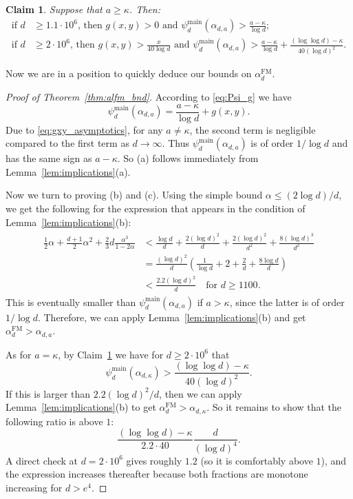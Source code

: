 \documentclass[12pt]{amsart}
\newtheorem{claim}[theorem]{Claim}
\theoremstyle{definition}
\newcommand\al{\alpha}
\newcommand\ka{\kappa}
\newcommand\alfm{\alpha^{\mathrm{FM}}}
\newcommand\psimain{\psi^{\mathrm{main}}}
\begin{document}
%
\begin{claim} \label{cl:g_pos}
Suppose that $a \geq \ka$. Then:
%
\begin{align*}
\text{if } d &\geq 1.1 \cdot 10^6
\text{, then } g(x,y)>0 
\text{ and } \psimain_d(\al_{d,a}) > \frac{a-\ka}{\log d} ;\\
\text{if } d &\geq 2 \cdot 10^6
\text{, then } g(x,y)> \frac{x}{40 \log d} 
\text{ and } \psimain_d(\al_{d,a}) > \frac{a-\ka}{\log d} 
+ \frac{(\log\log d)-\ka}{40(\log d)^2} .
\end{align*}
%
\end{claim}
%
Now we are in a position to quickly deduce our bounds on $\alfm_d$.
%
\begin{proof}[Proof of Theorem~\ref{thm:alfm_bnd}]
According to \eqref{eq:Psi_g} we have 
%
\[ \psimain_d(\al_{d,a}) = \frac{a-\ka}{\log d} + g(x,y) . \]
%
Due to \eqref{eq:gxy_asymptotics}, for any $a \neq \ka$, the second term is negligible compared to the first term as $d \to \infty$. Thus $\psimain_d(\al_{d,a})$ is of order $1/ \log d$ and has the same sign as $a-\ka$. So (a) follows immediately from Lemma~\ref{lem:implications}(a). 

Now we turn to proving (b) and (c). Using the simple bound $\al \leq (2 \log d)/d$, we get the following for the expression that appears in the condition of Lemma~\ref{lem:implications}(b):
%
\begin{align}
\begin{split}
\frac 12 \al + \frac{d+1}{2}\al^2 
+ \frac 23 d \frac{\al^3}{1-2\al} 
&< \frac{\log d}{d} 
+ \frac{2 (\log d)^2}{d} 
+ \frac{2 (\log d)^2}{d^2}
+ \frac{8 (\log d)^3}{d^2} \\ 
&= \frac{(\log d)^2}{d} 
\left( \frac{1}{\log d} + 2 + \frac{2}{d} 
+ \frac{8 \log d}{d} \right) \\
&< \frac{2.2 (\log d)^2}{d} 
\quad \text{for } d \geq 1100 .
\label{eq:cond_b_bnd}
\end{split}
\end{align}
%
This is eventually smaller than $\psimain_d(\al_{d,a})$ if $a>\ka$, since the latter is of order $1/ \log d$. Therefore, we can apply Lemma~\ref{lem:implications}(b) and get $\alfm_d > \al_{d,a}$. 

As for $a=\ka$, by Claim~\ref{cl:g_pos} we have for $d \geq 2 \cdot 10^6$ that 
%
\[ \psimain_d(\al_{d,\ka}) 
> \frac{(\log\log d)-\ka}{40(\log d)^2} .\]
%
If this is larger than $2.2 (\log d)^2/d$, then we can apply Lemma~\ref{lem:implications}(b) to get $\alfm_d > \al_{d,\ka}$. So it remains to show that the following ratio is above $1$:
%
\[ \frac{(\log\log d)-\ka}{2.2 \cdot 40} 
\frac{d}{(\log d)^4} .\]
%
A direct check at $d=2 \cdot 10^6$ gives roughly $1.2$ (so it is comfortably above $1$), and the expression increases thereafter because both fractions are monotone increasing for $d > e^4$. \end{proof}
%
\end{document}
